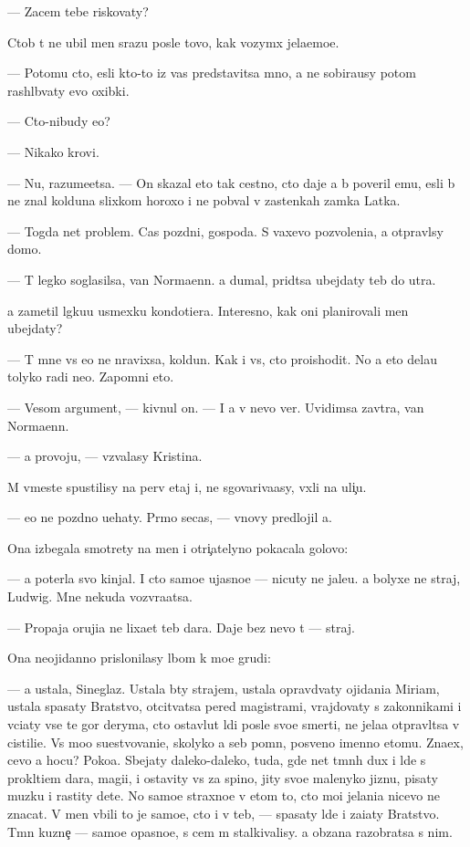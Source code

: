 \documentclass[10pt]{book}
\begin{document}
— Zacem tebe riskovaty?

Ctob{\yi} t{\yi} ne ubil men{\ia} srazu posle tovo, kak vozym{\e}x jela{\y}emo{\y}e.

— Potomu cto, {\y}esli kto-to iz vas predstavitsa mno{\y}, {\y}a ne sobira{\y}usy potom ras\-hl{\e}\-b{\yi}\-vaty {\y}evo oxibki.

— Cto-nibudy {\y}e{\x}o?

— Nikako{\y} krovi.

— Nu, razume{\y}etsa. — On skazal eto tak cestno, cto daje {\y}a b{\yi} poveril {\y}emu, {\y}esli b{\yi} ne znal kolduna slixkom horoxo i ne pob{\yi}val v zastenkah zamka Latka.

— Togda net problem. Cas pozdni{\y}, gospoda. S vaxevo pozvoleni{\y}a, {\y}a otpravl{\io}sy domo{\y}.

— T{\yi} legko soglasilsa, van Normaenn. {\Y}a dumal, prid{\e}tsa ubejdaty teb{\ia} do utra.

{\Y}a zametil l{\e}gku{\y}u usmexku kondotiera. Interesno, kak oni planirovali men{\ia} ubejdaty?

— T{\yi} mne vs{\e} {\y}e{\x}o ne nravixsa, koldun. Kak i vs{\e}, cto proishodit. No {\y}a eto dela{\y}u tolyko radi ne{\y}o. Zapomni eto.

— Vesom{\yi}{\y} argument, — kivnul on. — I {\y}a v nevo ver{\io}. Uvidimsa zavtra, van Normaenn.

— {\Y}a provoju, — v{\yi}zvalasy Kristina.

M{\yi} vmeste spustilisy na perv{\yi}{\y} etaj i, ne sgovariva{\y}asy, v{\yi}xli na uli{\c}u.

— {\Y}e{\x}o ne pozdno u{\y}ehaty. Pr{\ia}mo se{\y}cas, — vnovy predlojil {\y}a.

Ona izbegala smotrety na men{\ia} i otri{\c}atelyno pokacala go\-lo\-vo{\y}:

— {\Y}a poter{\ia}la svo{\y} kinjal. I cto samo{\y}e ujasno{\y}e — nicuty ne jale{\y}u. {\Y}a bolyxe ne straj, Ludwig. Mne nekuda vozvra{\x}atsa.

— Propaja oruji{\y}a ne lixa{\y}et teb{\ia} dara. Daje bez nevo t{\yi} — straj.

Ona neojidanno prislonilasy lbom k mo{\y}e{\y} grudi:

— {\Y}a ustala, Sineglaz{\yi}{\y}. Ustala b{\yi}ty strajem, ustala opravd{\yi}vaty ojidani{\y}a Mi\-ri\-am, ustala spasaty Bratstvo, otcit{\yi}vatsa pered magistrami, vrajdovaty s zakonnikami i v{\yi}ci{\x}aty vse te gor{\yi} deryma, cto ostavl{\ia}{\y}ut l{\io}di posle svo{\y}e{\y} smerti, ne jela{\y}a otpravl{\ia}tsa v cistili{\x}e. Vs{\e} mo{\y}o su{\x}estvovani{\y}e, skoly\-ko {\y}a seb{\ia} pomn{\io}, posv{\ia}{\x}eno imenno etomu. Zna{\y}ex, cevo {\y}a hocu? Poko{\y}a. Sbejaty daleko-daleko, tuda, gde net t{\e}mn{\yi}h dux i l{\io}de{\y} s prokl{\ia}ti{\y}em dara, magi{\y}i, i ostavity vs{\e} za spino{\y}, jity svo{\y}e{\y} malenyko{\y} jizn{\y}u, pisaty muz{\yi}ku i rastity dete{\y}. No samo{\y}e straxno{\y}e v etom to, cto mo{\y}i jelani{\y}a nicevo ne znacat. V men{\ia} vbili to je samo{\y}e, cto i v teb{\ia}, — spasaty l{\io}de{\y} i za{\x}i{\x}aty Bratstvo. T{\e}mn{\yi}{\y} kuzne{\c} — samo{\y}e opasno{\y}e, s cem m{\yi} stalki\-va\-lisy. {\Y}a ob{\ia}zana razobratsa s nim.
\end{document}
